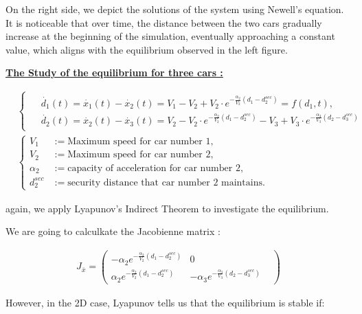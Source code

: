 \documentclass{article}
\begin{document}
	On the right side, we depict the solutions of the system using Newell's equation. It is noticeable that over time, the distance between the two cars gradually increase at the beginning of the simulation, eventually approaching a constant value, which aligns with the equilibrium observed in the left figure.
	
	\textbf{\underline{The Study of the equilibrium for three cars : }} \newline\newline
	
	\begin{align*}
		&\begin{cases}
			\begin{aligned}
				&\dot{d_1}(t) = \dot{x_1}(t) - \dot{x_2}(t) = V_1 - V_2 + V_2 \cdot e^{-\frac{\alpha_2}{V_2}(d_1 - d_{2}^{sec})} = f(d_1, t), \\
				&\dot{d_2}(t) = \dot{x_2}(t)-\dot{x_3}(t) = V_2 - V_2 \cdot e^{-\frac{\alpha_2}{V_2}(d_1 - d_{2}^{sec})} - V_3 + V_3 \cdot e^{-\frac{\alpha_3}{V_3}(d_2 - d_{3}^{sec})}
			\end{aligned}
		\end{cases}
		 \\
		&\left\{
		\begin{aligned}
			V_1 &:= \text{Maximum speed for car number 1}, \\
			V_2 &:= \text{Maximum speed for car number 2}, \\
			\alpha_2 &:= \text{capacity of acceleration for car number 2}, \\
			d_{2}^{sec} &:= \text{security distance that car number 2 maintains}.
		\end{aligned}
		\right.
	\end{align*}
	
	again, we apply Lyapunov's Indirect Theorem to investigate the equilibrium.
	
	
	We are going to calculkate the Jacobienne matrix : 
	
	\begin{align*}
		J_{\bar{x}}=\begin{pmatrix}
			-\alpha_2e^{-\frac{\alpha_2}{V_2}(d_1 - d_{2}^{sec})} & 0 & \\
			\alpha_2e^{-\frac{\alpha_2}{V_2}(d_1 - d_{2}^{sec})} & -\alpha_3e^{-\frac{\alpha_3}{V_3}(d_2 - d_{3}^{sec})} &
		\end{pmatrix}
	\end{align*}
	
	However, in the 2D case, Lyapunov tells us that the equilibrium is stable if:
	
\end{document}
